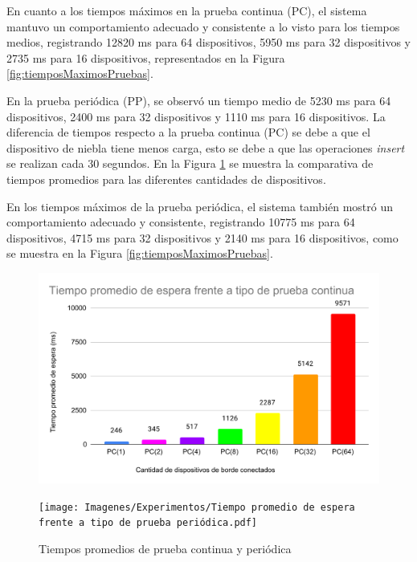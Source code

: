 En cuanto a los tiempos máximos en la prueba continua (PC), el sistema mantuvo un comportamiento adecuado y consistente a lo visto para los tiempos medios, registrando 12820 ms para 64 dispositivos, 5950 ms para 32 dispositivos y 2735 ms para 16 dispositivos, representados en la Figura \ref{fig:tiemposMaximosPruebas}.

En la prueba periódica (PP), se observó un tiempo medio de 5230 ms para 64 dispositivos, 2400 ms para 32 dispositivos y 1110 ms para 16 dispositivos. La diferencia de tiempos respecto a la prueba continua (PC) se debe a que el dispositivo de niebla tiene menos carga, esto se debe a que las operaciones \textit{insert} se realizan cada 30 segundos. En la Figura \ref{fig:tiemposPromediosPruebas} se muestra la comparativa de tiempos promedios para las diferentes cantidades de dispositivos.

En los tiempos máximos de la prueba periódica, el sistema también mostró un comportamiento adecuado y consistente, registrando 10775 ms para 64 dispositivos, 4715 ms para 32 dispositivos y 2140 ms para 16 dispositivos, como se muestra en la Figura \ref{fig:tiemposMaximosPruebas}.

\begin{figure}
    \centering
    \begin{minipage}{.8\textwidth}
        \centering
        \includegraphics[width=\textwidth]{Imagenes/Experimentos/Tiempo promedio de espera frente a tipo de prueba continua.pdf}
    \end{minipage}%
    \hfill
    \begin{minipage}{.8\textwidth}
        \centering
        \texttt{[image: Imagenes/Experimentos/Tiempo promedio de espera frente a tipo de prueba periódica.pdf]}
    \end{minipage}%
   
    \caption{Tiempos promedios de prueba continua y periódica}
    \label{fig:tiemposPromediosPruebas}
\end{figure}



